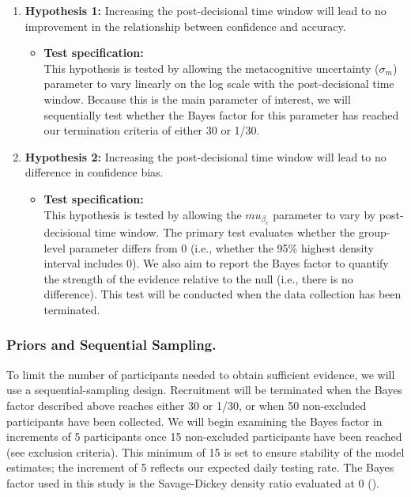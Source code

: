 \documentclass[
]{article}
\providecommand{\tightlist}{%
  \setlength{\itemsep}{0pt}\setlength{\parskip}{0pt}}
\begin{document}
\begin{enumerate}
\def\labelenumi{\arabic{enumi}.}
\item
  \textbf{Hypothesis 1:} Increasing the post-decisional time window will
  lead to no improvement in the relationship between confidence and
  accuracy.

  \begin{itemize}
  \tightlist
  \item
    \textbf{Test specification:}\\
    This hypothesis is tested by allowing the metacognitive uncertainty
    (\(\sigma_m\)) parameter to vary linearly on the log scale with the
    post-decisional time window. Because this is the main parameter of
    interest, we will sequentially test whether the Bayes factor for
    this parameter has reached our termination criteria of either 30 or
    1/30.
  \end{itemize}
\item
  \textbf{Hypothesis 2:} Increasing the post-decisional time window will
  lead to no difference in confidence bias.

  \begin{itemize}
  \tightlist
  \item
    \textbf{Test specification:}\\
    This hypothesis is tested by allowing the \(mu_{\beta_c}\) parameter
    to vary by post-decisional time window. The primary test evaluates
    whether the group-level parameter differs from 0 (i.e., whether the
    95\% highest density interval includes 0). We also aim to report the
    Bayes factor to quantify the strength of the evidence relative to
    the null (i.e., there is no difference). This test will be conducted
    when the data collection has been terminated.
  \end{itemize}
\end{enumerate}

\subsubsection{Priors and Sequential
Sampling.}\label{priors-and-sequential-sampling.}

To limit the number of participants needed to obtain sufficient
evidence, we will use a sequential-sampling design. Recruitment will be
terminated when the Bayes factor described above reaches either 30 or
1/30, or when 50 non-excluded participants have been collected. We will
begin examining the Bayes factor in increments of 5 participants once 15
non-excluded participants have been reached (see exclusion criteria).
This minimum of 15 is set to ensure stability of the model estimates;
the increment of 5 reflects our expected daily testing rate. The Bayes
factor used in this study is the Savage-Dickey density ratio evaluated
at 0
().
\end{document}
